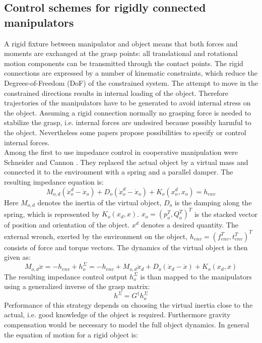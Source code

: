 \documentclass[a4paper,twoside, openright,12pt]{report}
\begin{document}
\subsection{Control schemes for rigidly connected manipulators}
A rigid fixture between manipulator and object means that both forces and moments are exchanged at the grasp points: all translational and rotational motion components can be transmitted through the contact points. The rigid connections are expressed by a number of kinematic constraints, which reduce the Degrees-of-Freedom (DoF) of the constrained system. The attempt to move in the constrained directions results in internal loading of the object. Therefore trajectories of the manipulators have to be generated to avoid internal stress on the object. Assuming a rigid connection normally no grasping force is needed to stabilize the grasp, i.e. internal forces are undesired because possibly harmful to the object. Nevertheless some papers propose possibilities to specify or control internal forces.\\
Among the first to use impedance control in cooperative manipulation were Schneider and Cannon \cite{Schneider_92}. They replaced the actual object by a virtual mass and connected it to the environment with a spring and a parallel damper. The resulting impedance equation is:
\begin{equation}
M_{o,d} (\ddot{x}_o^d - \ddot{x}_o) + D_o (\dot{x}_o^d - \dot{x}_o) + K_o(x_o^d,x_o) = h_{env} 
\end{equation}
Here $ M_{o,d} $ denotes the inertia of the virtual object, $ D_o $ is the damping along the spring, which is represented by $ K_o(x_d,x) $. $ x_o = (p_o^T,Q_o^T)^T $ is the stacked vector of position and orientation of the object. $ x^d $ denotes a desired quantity. The external wrench, exerted by the environment on the object, $ h_{env} = (f_{env}^T,t_{env}^T)^T$ consists of force and torque vectors.
The dynamics of the virtual object is then given as:
\begin{equation}
M_{o,d}\ddot{x} = -h_{env} + h_o^{\Sigma} = -h_{env} + M_{o,d}\ddot{x}_d + D_o (\dot{x}_d - \dot{x}) + K_o(x_d,x)
\end{equation}
The resulting impedance control output $ h_o^{\Sigma} $ is than mapped to the manipulators using a generalized inverse of the grasp matrix:
\begin{equation}
h^{\Sigma} = G^\dagger h_o^{\Sigma}
\end{equation}
Performance of this strategy depends on choosing the virtual inertia close to the actual, i.e. good knowledge of the object is required. Furthermore gravity compensation would be necessary to model the full object dynamics. In general the equation of motion for a rigid object is:
\end{document}
